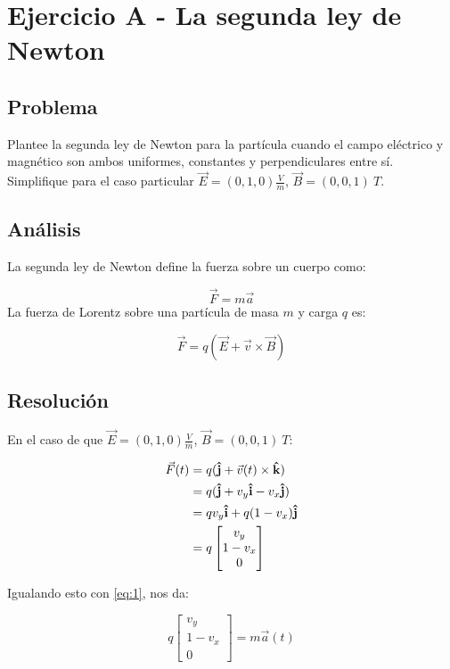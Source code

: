 \section{Ejercicio A - La segunda ley de Newton}

\subsection{Problema}

Plantee la segunda ley de Newton para la partícula cuando el campo eléctrico y magnético son ambos uniformes, constantes y perpendiculares entre sí. Simplifique para el caso particular $\vec{E} = (0, 1, 0) \frac{V}{m}$, $\vec{B} = (0, 0, 1)\ T$.

\subsection{Análisis}

La segunda ley de Newton define la fuerza sobre un cuerpo como:

\begin{equation}\label{eq:1}
	\vec{F} = m \vec{a}
\end{equation}
La fuerza de Lorentz sobre una partícula de masa $m$ y carga $q$ es:

\begin{equation}
	\vec{F} = q(\vec{E} + \vec{v} \times \vec{B})
\end{equation}

\subsection{Resolución}



En el caso de que $\vec{E} = (0, 1, 0) \frac{V}{m}$, $\vec{B} = (0, 0, 1)\ T$:

\begin{align*}
\vec{F}(t)  
& =
	q(\boldsymbol{\hat{\textbf{j}}} + \vec{v}(t) \times \boldsymbol{\hat{\textbf{k}}}) \\
& =
	q(\boldsymbol{\hat{\textbf{j}}} + v_y \boldsymbol{\hat{\textbf{i}}} - v_x \boldsymbol{\hat{\textbf{j}}} ) \\
& = 
	qv_y \boldsymbol{\hat{\textbf{i}}} + q(1-v_x)\boldsymbol{\hat{\textbf{j}}} \\
& =
	q \begin{bmatrix}
		v_y \\
		1 - v_x \\
		0
	\end{bmatrix}
\end{align*}

Igualando esto con \eqref{eq:1}, nos da:

\begin{equation*}
	q \begin{bmatrix}
	v_y \\
	1 - v_x \\
	0
\end{bmatrix} = m \vec{a}(t)
\end{equation*}